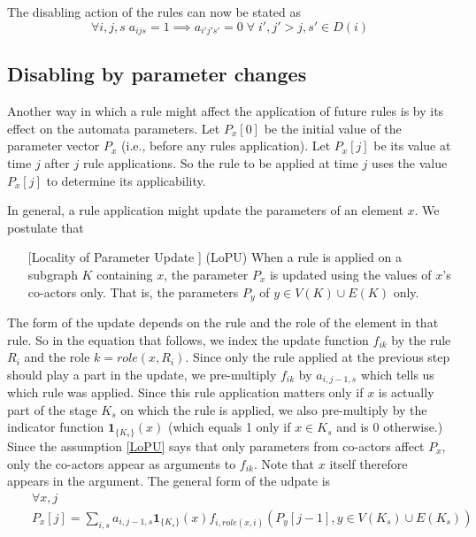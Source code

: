 \documentclass[11pt, oneside, reqno]{article}
\begin{document}
The disabling action of the rules can now be stated as
\begin{equation}
\label{eq:disabling}
\forall i,j,s \; a_{ijs} =1 \implies a_{i'j's'} = 0 \;\forall \; i', j'>j,s' \in D(i)
\end{equation}

\subsection{Disabling by parameter changes}
Another way in which a rule might affect the application of future rules is by its effect on the automata parameters.
Let $P_x[0]$ be the initial value of the parameter vector $P_x$ (i.e., before any rules application).
Let $P_x[j]$ be its value at time $j$ after $j$ rule applications.
So the rule to be applied at time $j$ uses the value $P_x[j]$ to determine its applicability.

In general, a rule application might update the parameters of an element $x$.
We postulate that 
\begin{enumerate}
	\item [[Locality of Parameter Update]] (LoPU) When a rule is applied on a subgraph $K$ containing $x$, the parameter $P_x$ is updated using the values of $x$'s co-actors only. 
	That is, the parameters $P_y$ of $y \in V(K)\cup E(K)$ only.
	\label{LoPU}
\end{enumerate}

The form of the update depends on the rule and the role of the element in that rule.
So in the equation that follows, we index the update function $f_{ik}$ by the rule $R_i$ and the role $k=role(x,R_i)$.
Since only the rule applied at the previous step should play a part in the update, we pre-multiply $f_{ik}$ by $a_{i,j-1,s}$ which tells us which rule was applied.
Since this rule application matters only if $x$ is actually part of the stage $K_s$ on which the rule is applied, we also pre-multiply by the indicator function $\mathbf{1}_{\{K_s\}}(x)$ (which equals 1 only if $x\in K_s$ and is 0 otherwise.)
Since the assumption \ref{LoPU} says that only parameters from co-actors affect $P_x$, only the co-actors appear as arguments to $f_{ik}$.
Note that $x$ itself therefore appears in the argument.
The general form of the udpate is
\begin{eqnarray}
\label{eq:paramUpdate}
&& \forall x, j
\\
&& P_x[j] =  \sum_{i,s}a_{i,j-1,s} \mathbf{1}_{\{K_s\}}(x) f_{i,role(x,i)}(P_y[j-1],y \in V(K_s)\cup E(K_s))
\nonumber
\end{eqnarray}
\end{document}

